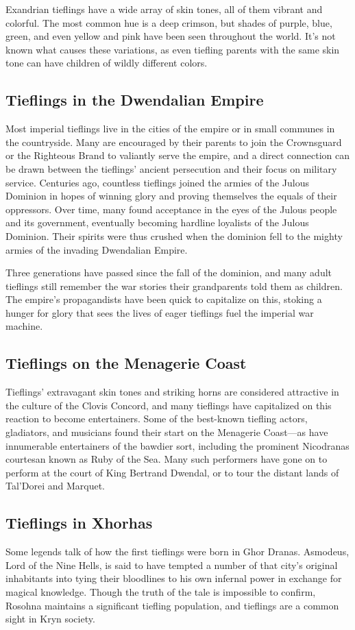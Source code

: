 \documentclass[10pt,a4paper,twoside,bg=print,twocolumn,openany,nodeprecatedcode]{dndbook}
\begin{document}
Exandrian tieflings have a wide array of skin tones, all of them vibrant and colorful. The most common hue is a deep crimson, but shades of purple, blue, green, and even yellow and pink have been seen throughout the world. It's not known what causes these variations, as even tiefling parents with the same skin tone can have children of wildly different colors.

\subsection{Tieflings in the Dwendalian Empire}
Most imperial tieflings live in the cities of the empire or in small communes in the countryside. Many are encouraged by their parents to join the Crownsguard or the Righteous Brand to valiantly serve the empire, and a direct connection can be drawn between the tieflings' ancient persecution and their focus on military service. Centuries ago, countless tieflings joined the armies of the Julous Dominion in hopes of winning glory and proving themselves the equals of their oppressors. Over time, many found acceptance in the eyes of the Julous people and its government, eventually becoming hardline loyalists of the Julous Dominion. Their spirits were thus crushed when the dominion fell to the mighty armies of the invading Dwendalian Empire.

Three generations have passed since the fall of the dominion, and many adult tieflings still remember the war stories their grandparents told them as children. The empire's propagandists have been quick to capitalize on this, stoking a hunger for glory that sees the lives of eager tieflings fuel the imperial war machine.

\subsection{Tieflings on the Menagerie Coast}
Tieflings' extravagant skin tones and striking horns are considered attractive in the culture of the Clovis Concord, and many tieflings have capitalized on this reaction to become entertainers. Some of the best-known tiefling actors, gladiators, and musicians found their start on the Menagerie Coast—as have innumerable entertainers of the bawdier sort, including the prominent Nicodranas courtesan known as Ruby of the Sea. Many such performers have gone on to perform at the court of King Bertrand Dwendal, or to tour the distant lands of Tal'Dorei and Marquet.

\subsection{Tieflings in Xhorhas}
Some legends talk of how the first tieflings were born in Ghor Dranas. Asmodeus, Lord of the Nine Hells, is said to have tempted a number of that city's original inhabitants into tying their bloodlines to his own infernal power in exchange for magical knowledge. Though the truth of the tale is impossible to confirm, Rosohna maintains a significant tiefling population, and tieflings are a common sight in Kryn society.
\end{document}

